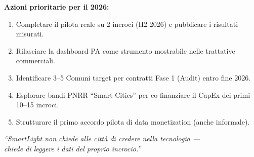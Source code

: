 \documentclass[a4paper,11pt]{article}
\begin{document}
\vspace{0.4cm}
\noindent\textbf{Azioni prioritarie per il 2026:}
\begin{enumerate}[nosep, topsep=4pt]
    \item Completare il pilota reale su 2 incroci (H2 2026) e pubblicare i risultati misurati.
    \item Rilasciare la dashboard PA come strumento mostrabile nelle trattative commerciali.
    \item Identificare 3--5 Comuni target per contratti Fase 1 (Audit) entro fine 2026.
    \item Esplorare bandi PNRR ``Smart Cities'' per co-finanziare il CapEx dei primi 10--15 incroci.
    \item Strutturare il primo accordo pilota di data monetization (anche informale).
\end{enumerate}

\vspace{1cm}
\begin{center}
    \textit{``SmartLight non chiede alle città di credere nella tecnologia ---}\\
    \textit{chiede di leggere i dati del proprio incrocio.''}
\end{center}
\end{document}
